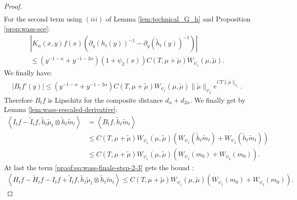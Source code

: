 \documentclass[11pt,a4paper]{article}
\newcommand{\brac}[1]{\left\langle#1\right\rangle}
\begin{document}
\begin{proof}
\begin{align*}
    \end{align*}
    For the second term using $(iii)$ of Lemma \ref{lem:technical_G_h} and Proposition \ref{prop:wass-sce}:
    \begin{multline*}
        \left| K_\alpha(x,y) f(x)\left( \partial_y \left(h_t(y) \right)^{-1} - \partial_y \left(\tilde{h}_t(y) \right)^{-1} \right) \right| \\
        \leq (y^{-1-\alpha} + y^{-1-2\alpha})(1 + \psi_2(x)) C(T,\mu + \tilde{\mu})  W_{\psi_1}(\mu,\tilde{\mu}).
    \end{multline*}
    We finally have:
    \begin{align*}
        \left| B_tf'(y)\right| \leq (y^{-1-\alpha} + y^{-1-2\alpha})C(T,\mu + \tilde{\mu})  W_{\psi_1}(\mu,\tilde{\mu}) \|\tilde{\mu}\|_{\psi_2} e^{CT\|\tilde{\mu}\|_{\psi_1}}.
    \end{align*}
    Therefore $B_tf$ is Lipschitz for the composite distance $d_\alpha + d_{2\alpha}$. We finally get by Lemma \ref{lem:wass-rescaled-derivative}:
    \begin{align*}
        \brac{I_tf - \tilde{I}_tf, \tilde{h}_t\tilde{\mu}_t\otimes \tilde{h}_t\tilde{m}_t} 
        &= \brac{B_tf,\tilde{h}_t\tilde{m}_t} \\
        &\leq C(T,\mu + \tilde{\mu}) W_{\psi_1}(\mu,\tilde{\mu}) \left(W_{\psi_1}(\tilde{h}_t\tilde{m}_t) + W_{\psi_2}(\tilde{h}_t\tilde{m}_t) \right)\\
        &\leq C(T,\mu + \tilde{\mu}) W_{\psi_1}(\mu,\tilde{\mu})\left(W_{\psi_1}(m_0) + W_{\psi_2}(m_0) \right).
    \end{align*}
    At last the term \eqref{proof:eq:wass-finale-step-2-3} gets the bound :
    \begin{align*}
        \brac{H_tf - \tilde{H}_tf - I_tf + \tilde{I}_tf, \tilde{h}_t\tilde{\mu}_t\otimes \tilde{h}_t\tilde{m}_t} 
        \leq C(T,\mu + \tilde{\mu}) W_{\psi_1}(\mu,\tilde{\mu})\left(W_{\psi_1}(m_0) + W_{\psi_2}(m_0) \right).
    \end{align*}


\end{proof}
\end{document}
